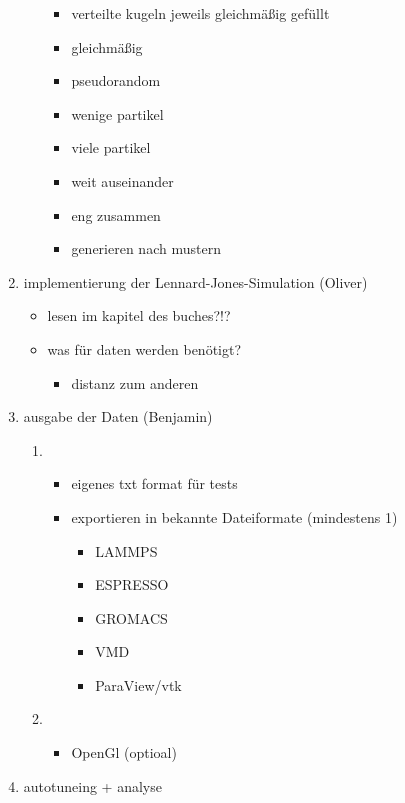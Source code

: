 \documentclass[a4paper]{article}
\begin{document}
\begin{enumerate}
\begin{itemize}
\begin{itemize}
        	\item  verteilte kugeln jeweils gleichmäßig gefüllt
        	\item  gleichmäßig
        	\item  pseudorandom
        	\item  wenige partikel
        	\item  viele partikel
        	\item  weit auseinander
        	\item  eng zusammen
        	\item  generieren nach mustern
        \end{itemize}
    \end{itemize}
\item implementierung der Lennard-Jones-Simulation (Oliver)
	\begin{itemize}
        \item lesen im kapitel des buches?!?
        \item was für daten werden benötigt?
        \begin{itemize}
        	\item distanz zum anderen
        \end{itemize}
    \end{itemize}
\item ausgabe der Daten (Benjamin)
	\begin{enumerate}
		\item 
        \begin{itemize}
        	\item eigenes txt format für tests
            \item exportieren in bekannte Dateiformate (mindestens 1)
			\begin{itemize}
	            \item LAMMPS
	            \item ESPRESSO
	            \item GROMACS
	            \item VMD
	            \item ParaView/vtk
	        \end{itemize}
        \end{itemize}
		\item
        \begin{itemize}
        	\item OpenGl (optioal)
        \end{itemize}
    \end{enumerate}
\item autotuneing + analyse

\end{enumerate}
\end{document}

